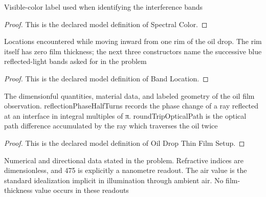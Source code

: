 \begin{definition}
  \label{def:physics:phyx-mini-0084:phyxminiproblems-problemphyxmini0084-spectralcolor}
  Visible-color label used when identifying the interference bands
\end{definition}
\begin{proof}
  This is the declared model definition of Spectral Color.
\end{proof}
\begin{definition}
  \label{def:physics:phyx-mini-0084:phyxminiproblems-problemphyxmini0084-bandlocation}
  Locations encountered while moving inward from one rim of the oil drop. The rim itself has zero film thickness; the next three constructors name the successive blue reflected-light bands asked for in the problem
\end{definition}
\begin{proof}
  This is the declared model definition of Band Location.
\end{proof}
\begin{definition}
  \label{def:physics:phyx-mini-0084:phyxminiproblems-problemphyxmini0084-oildropthinfilmsetup}
  The dimensionful quantities, material data, and labeled geometry of the oil film observation. reflectionPhaseHalfTurns records the phase change of a ray reflected at an interface in integral multiples of π. roundTripOpticalPath is the optical path difference accumulated by the ray which traverses the oil twice
\end{definition}
\begin{proof}
  This is the declared model definition of Oil Drop Thin Film Setup.
\end{proof}
\begin{definition}
  \label{def:physics:phyx-mini-0084:phyxminiproblems-problemphyxmini0084-hasproblemreadouts}
  Numerical and directional data stated in the problem. Refractive indices are dimensionless, and 475 is explicitly a nanometre readout. The air value is the standard idealization implicit in illumination through ambient air. No film-thickness value occurs in these readouts
\end{definition}
